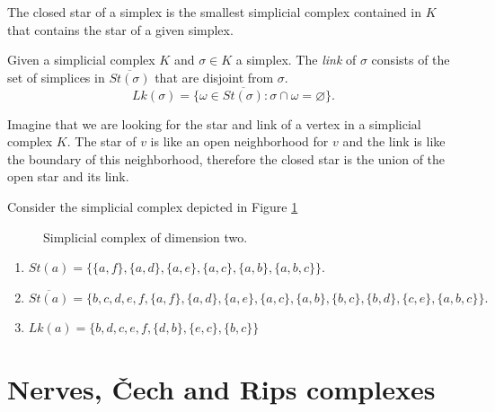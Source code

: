 \documentclass[
	fontsize=10pt, %
	twoside=false, %
	secnumdepth=1, %
]{kaobook}
\begin{document}
The closed star of a simplex is the smallest simplicial complex contained in $K$ that contains the star of a given simplex.

\begin{definition}
Given a simplicial complex $K$ and $\sigma\in K$ a simplex. The \emph{link} of $\sigma$ consists of the set of simplices in $\overline{St(\sigma)}$ that are disjoint from $\sigma.$ $$Lk(\sigma)=\{\omega\in \overline{St(\sigma)}: \sigma\cap \omega=\varnothing\}.$$
\end{definition}

Imagine that we are looking for the star and link of a vertex in a simplicial complex $K.$ The star of $v$ is like an open neighborhood for $v$ and the link is like the boundary of this neighborhood, therefore the closed star is the union of the open star and its link. 

\begin{example}
Consider the simplicial complex depicted in Figure \ref{C2:Fig:SimplicialComplex2}

\begin{figure}[h]
\caption{Simplicial complex of dimension two.}
\label{C2:Fig:SimplicialComplex2}
\end{figure}

\begin{enumerate}
\item $St(a)=\{\{a,f\},\{a,d\},\{a,e\},\{a,c\},\{a,b\},\{a,b,c\}\}.$
\item $\overline{St(a)}=\{b,c,d,e,f,\{a,f\},\{a,d\},\{a,e\},\{a,c\},\{a,b\},\{b,c\},\{b,d\},\{c,e\},\{a,b,c\}\}.$
\item $Lk(a)=\{b,d,c,e,f,\{d,b\},\{e,c\},\{b,c\}\}$
\end{enumerate}
\end{example}

\section{Nerves, \v{C}ech and Rips complexes}
\end{document}
